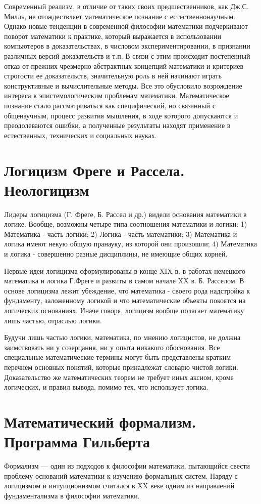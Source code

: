 \documentclass[12pt, specialist, subf, substylefile = spbu.rtx]{disser}
\begin{document}
Современный реализм, в отличие от таких своих предшественников, как Дж.С. Милль, не отождествляет математическое познание с естественнонаучным. Однако новые тенденции в современной философии математики подчеркивают поворот математики к практике, который выражается в использовании компьютеров в доказательствах, в числовом экспериментировании, в признании различных версий доказательств и т.п. В связи с этим происходит постепенный отказ от прежних чрезмерно абстрактных концепций математики и критериев строгости ее доказательств, значительную роль в ней начинают играть конструктивные и вычислительные методы. Все это обусловило возрождение интереса к эпистемологическим проблемам математики. Математическое познание стало рассматриваться как специфический, но связанный с общенаучным, процесс развития мышления, в ходе которого допускаются и преодолеваются ошибки, а полученные результаты находят применение в естественных, технических и социальных науках. 

\section{Логицизм Фреге и Рассела. Неологицизм}
Лидеры логицизма (Г. Фреге, Б. Рассел и др.) видели основания математики в логике. Вообще, возможны четыре типа соотношения математики и логики: 1) Математика - часть логики; 2) Логика - часть математики; 3) Математика и логика имеют некую общую пранауку, из которой они произошли; 4) Математика и логика - совершенно разные дисциплины, не имеющие общих корней.

Первые идеи логицизма сформулированы в конце XIX в. в работах немецкого математика и логика Г.Фреге и развиты в самом начале XX в. Б. Расселом.
В основе логицизма лежит убеждение, что математика - своего рода надстройка к фундаменту, заложенному логикой и что математические объекты покоятся на логических основаниях. Иначе говоря, логицизм вообще полагает математику лишь частью, отраслью логики.

Будучи лишь частью логики, математика, по мнению логицистов, не должна заимствовать ни у созерцания, ни у опыта никакого обоснования. Все специальные математические термины могут быть представлены кратким перечнем основных понятий, которые принадлежат словарю чистой логики. Доказательство же математических теорем не требует иных аксиом, кроме логических, и правил вывода, помимо тех, что использует логика.

\section{Математический формализм. Программа Гильберта}
Формализм — один из подходов к философии математики, пытающийся свести проблему оснований математики к изучению формальных систем. Наряду с логицизмом и интуиционизмом считался в XX веке одним из направлений фундаментализма в философии математики.
\end{document}

